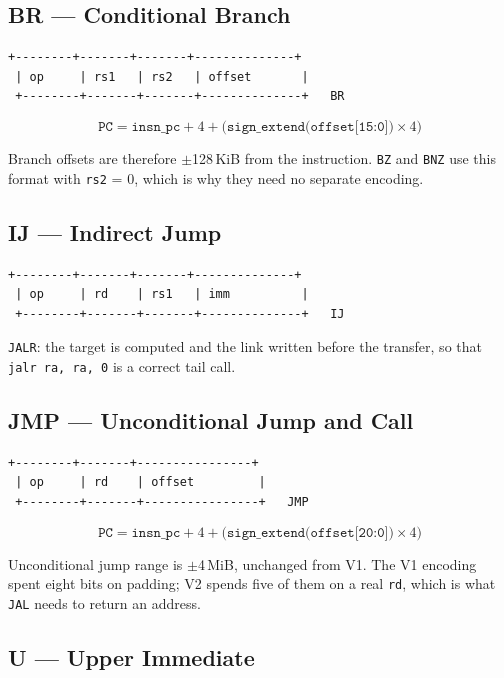 \documentclass[11pt,a4paper]{article}
\begin{document}
\subsection{BR --- Conditional Branch}

\begin{lstlisting}[style=Bits]
 +--------+-------+-------+--------------+
 | op     | rs1   | rs2   | offset       |
 +--------+-------+-------+--------------+   BR
\end{lstlisting}

\[
\texttt{PC} = \texttt{insn\_pc} + 4 + \big(\texttt{sign\_extend(offset[15:0])} \times 4\big)
\]

Branch offsets are therefore $\pm$128\,KiB from the instruction. \texttt{BZ} and
\texttt{BNZ} use this format with \texttt{rs2} = 0, which is why they need no
separate encoding.

\subsection{IJ --- Indirect Jump}

\begin{lstlisting}[style=Bits]
 +--------+-------+-------+--------------+
 | op     | rd    | rs1   | imm          |
 +--------+-------+-------+--------------+   IJ
\end{lstlisting}

\texttt{JALR}: the target is computed and the link written before the transfer,
so that \texttt{jalr ra, ra, 0} is a correct tail call.

\subsection{JMP --- Unconditional Jump and Call}

\begin{lstlisting}[style=Bits]
 +--------+-------+----------------+
 | op     | rd    | offset         |
 +--------+-------+----------------+   JMP
\end{lstlisting}

\[
\texttt{PC} = \texttt{insn\_pc} + 4 + \big(\texttt{sign\_extend(offset[20:0])} \times 4\big)
\]

Unconditional jump range is $\pm$4\,MiB, unchanged from V1. The V1 encoding
spent eight bits on padding; V2 spends five of them on a real \texttt{rd}, which
is what \texttt{JAL} needs to return an address.

\subsection{U --- Upper Immediate}
\end{document}
